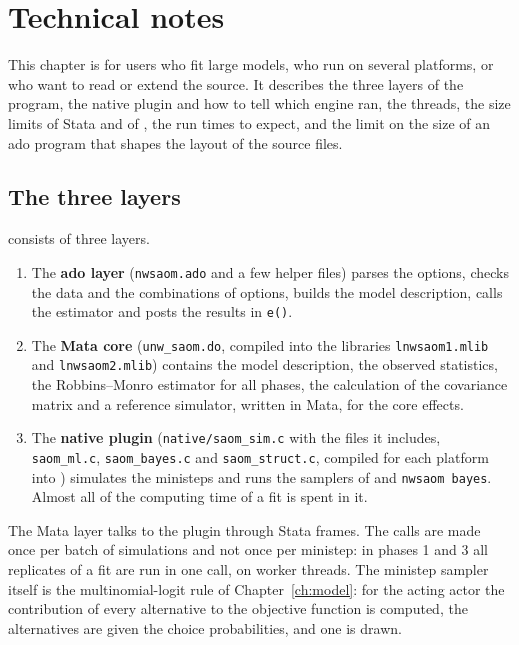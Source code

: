 \chapter{Technical notes}\label{ch:technical}

This chapter is for users who fit large models, who run \nwsaom{} on several platforms, or who want to read or extend the source. It describes the three layers of the program, the native plugin and how to tell which engine ran, the threads, the size limits of Stata and of \nwsaom, the run times to expect, and the limit on the size of an ado program that shapes the layout of the source files.

\section{The three layers}

\nwsaom{} consists of three layers.
\begin{enumerate}[nosep]
  \item The \textbf{ado layer} (\texttt{nwsaom.ado} and a few helper files) parses the options, checks the data and the combinations of options, builds the model description, calls the estimator and posts the results in \texttt{e()}.
  \item The \textbf{Mata core} (\texttt{unw\_saom.do}, compiled into the libraries \texttt{lnwsaom1.mlib} and \texttt{lnwsaom2.mlib}) contains the model description, the observed statistics, the Robbins--Monro estimator for all phases, the calculation of the covariance matrix and a reference simulator, written in Mata, for the core effects.
  \item {\sloppy The \textbf{native plugin} (\texttt{native/saom\_sim.c} with the files it includes, \texttt{saom\_ml.c}, \texttt{saom\_bayes.c} and \texttt{saom\_struct.c}, compiled for each platform into \allowbreak{}) simulates the ministeps and runs the samplers of  and \texttt{nwsaom bayes}. Almost all of the computing time of a fit is spent in it.\par}
\end{enumerate}
The Mata layer talks to the plugin through Stata frames. The calls are made once per batch of simulations and not once per ministep: in phases 1 and 3 all replicates of a fit are run in one call, on worker threads. The ministep sampler itself is the multinomial-logit rule of Chapter~\ref{ch:model}: for the acting actor the contribution of every alternative to the objective function is computed, the alternatives are given the choice probabilities, and one is drawn.

